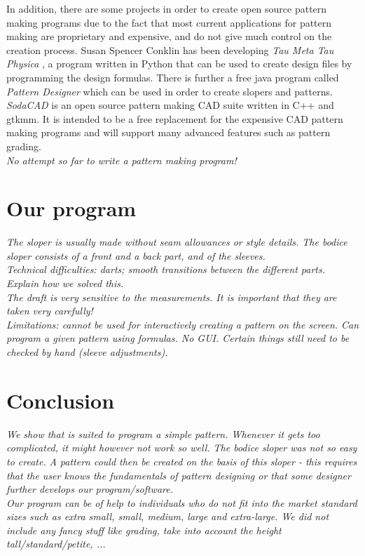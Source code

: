 \documentclass[10pt,letterpaper]{ltugboat}
\begin{document}
In addition, there are some projects in order to create open source pattern making programs due to the fact that most current applications for pattern making are proprietary and expensive, and do not give much control on the creation process. Susan Spencer Conklin has been developing \textit{Tau Meta Tau Physica} \cite{taumeta}, a program written in Python that can be used to create design files by programming the design formulas. There is further a free java program called \textit{Pattern Designer} \cite{patterndesigner} which can be used in order to create slopers and patterns. \textit{SodaCAD} \cite{sodacad} is an open source pattern making CAD suite written in C++ and gtkmm. It is intended to be a free replacement for the expensive CAD pattern making programs and will support many advanced features such as pattern grading.\\
\textit{No attempt so far to write a \MP { }pattern making program!}


\section{Our \MP { }program}
\textit{The sloper is usually made without seam allowances or style details. The bodice sloper consists of a front and a back part, and of the sleeves.}\\
\textit{Technical difficulties: darts; smooth transitions between the different parts. Explain how we solved this.}\\
\textit{The draft is very sensitive to the measurements. It is important that they are taken very carefully!}\\
\textit{Limitations: \MP { }cannot be used for interactively creating a pattern on the screen. Can program a given pattern using formulas. No GUI. Certain things still need to be checked by hand (sleeve adjustments).}

\section{Conclusion}
\textit{We show that \MP { }is suited to program a simple pattern. Whenever it gets too complicated, it might however not work so well. The bodice sloper was not so easy to create.}
\textit{A pattern could then be created on the basis of this sloper - this requires that the user knows the fundamentals of pattern designing or that some designer further develops our program/software.}\\ 
\textit{Our program can be of help to individuals who do not fit into the market standard sizes such as extra small, small, medium, large and extra-large.
\textit{We did not include any fancy stuff like grading, take into account the height tall/standard/petite, ...}}
\end{document}

